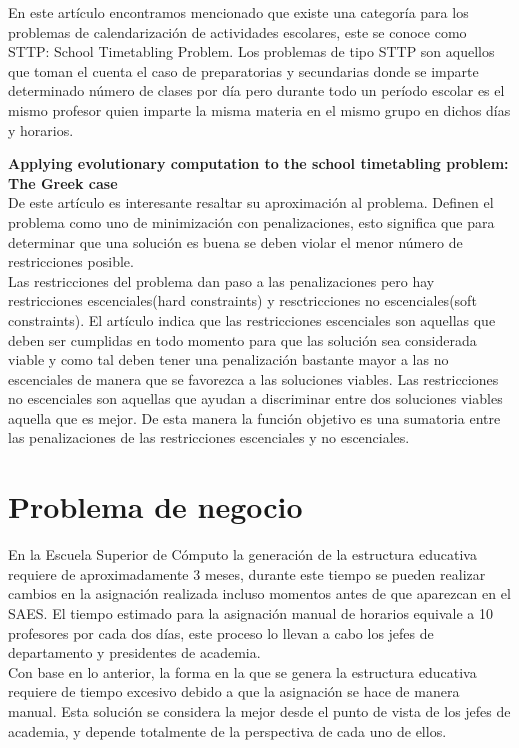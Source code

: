 	En este artículo encontramos mencionado que existe una categoría para los problemas de calendarización de actividades escolares, este se conoce como STTP: School Timetabling Problem. Los problemas de tipo STTP son aquellos que toman el cuenta el caso de preparatorias y secundarias donde se imparte determinado número de clases por día pero durante todo un período escolar es el mismo profesor quien imparte la misma materia en el mismo grupo en dichos días y horarios.  
		
	\textbf{Applying evolutionary computation to the school timetabling problem: The Greek case} \\
	
	De este artículo es interesante resaltar su aproximación al problema. Definen el problema como uno de minimización con penalizaciones, esto significa que para determinar que una solución es buena se deben violar el menor número de restricciones posible.\\
	
	Las restricciones del problema dan paso a las penalizaciones pero hay restricciones escenciales(hard constraints) y resctricciones no escenciales(soft constraints). El artículo indica que las restricciones escenciales son aquellas que deben ser cumplidas en todo momento para que las solución sea considerada viable y como tal deben tener una penalización bastante mayor a las no escenciales de manera que se favorezca a las soluciones viables. Las restricciones no escenciales son aquellas que ayudan a discriminar entre dos soluciones viables aquella que es mejor. De esta manera la función objetivo es una sumatoria entre las penalizaciones de las restricciones escenciales y no escenciales.
	   
\section{Problema de negocio}
	En la Escuela Superior de Cómputo la generación de la estructura educativa requiere de aproximadamente 3 meses, durante este tiempo se pueden realizar cambios en la asignación realizada incluso momentos antes de que aparezcan en el SAES. El tiempo estimado para la asignación manual de horarios equivale a 10 profesores por cada dos días, este proceso lo llevan a cabo los jefes de departamento y presidentes de academia. \\
	
	Con base en lo anterior, la forma en la que se genera la estructura educativa requiere de tiempo excesivo debido a que la asignación se hace de manera manual. Esta solución se considera la mejor desde el punto de vista de los jefes de academia, y depende totalmente de la perspectiva de cada uno de ellos.

